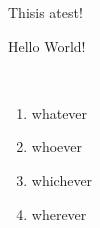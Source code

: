 \documentclass[a4paper,11pt]{article}
\begin{document}
Thisis atest!

Hello World!


\\
\begin{enumerate}
	\item whatever
	\item whoever
	\item whichever
	\item wherever
\end{enumerate}
\end{document}
